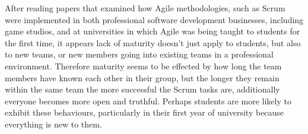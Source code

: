 \documentclass{scrartcl}
\begin{document}
After reading papers that examined how Agile methodologies, such as Scrum were implemented in both professional software development businesses, including game studios, and at universities in which Agile was being taught to students for the first time, it appears lack of maturity doesn’t just apply to students, but also to new teams, or new members going into existing teams in a professional environment. Therefore maturity seems to be effected by how long the team members have known each other in their group, but the longer they remain within the same team the more successful the Scrum tasks are, additionally everyone becomes more open and truthful. Perhaps students are more likely to exhibit these behaviours, particularly in their first year of university because everything is new to them.



\end{document}
